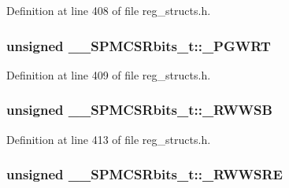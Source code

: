 Definition at line 408 of file reg\+\_\+structs.\+h.

\hypertarget{union_____s_p_m_c_s_rbits__t_ae78dee1df7d0afee1fb42984f0e99257}{
\subsubsection[{\+\_\+\+P\+G\+W\+R\+T}]{\setlength{\rightskip}{0pt plus 5cm}unsigned \+\_\+\+\_\+\+S\+P\+M\+C\+S\+Rbits\+\_\+t\+::\+\_\+\+P\+G\+W\+R\+T}}\label{union_____s_p_m_c_s_rbits__t_ae78dee1df7d0afee1fb42984f0e99257}


Definition at line 409 of file reg\+\_\+structs.\+h.

\hypertarget{union_____s_p_m_c_s_rbits__t_a67babcbf3b8656edc7224f97183d5429}{
\subsubsection[{\+\_\+\+R\+W\+W\+S\+B}]{\setlength{\rightskip}{0pt plus 5cm}unsigned \+\_\+\+\_\+\+S\+P\+M\+C\+S\+Rbits\+\_\+t\+::\+\_\+\+R\+W\+W\+S\+B}}\label{union_____s_p_m_c_s_rbits__t_a67babcbf3b8656edc7224f97183d5429}


Definition at line 413 of file reg\+\_\+structs.\+h.

\hypertarget{union_____s_p_m_c_s_rbits__t_ab4a9d602876db9be9e6e7dcaebc279a2}{
\subsubsection[{\+\_\+\+R\+W\+W\+S\+R\+E}]{\setlength{\rightskip}{0pt plus 5cm}unsigned \+\_\+\+\_\+\+S\+P\+M\+C\+S\+Rbits\+\_\+t\+::\+\_\+\+R\+W\+W\+S\+R\+E}}\label{union_____s_p_m_c_s_rbits__t_ab4a9d602876db9be9e6e7dcaebc279a2}


